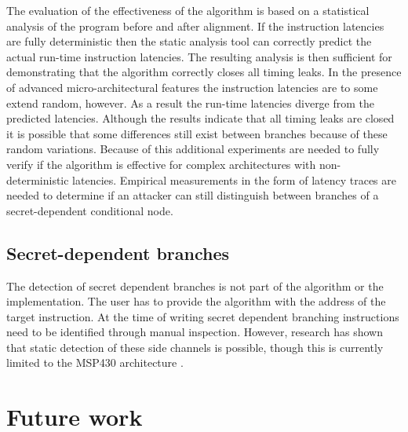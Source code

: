 The evaluation of the effectiveness of the algorithm is based on a statistical analysis of the program before and after alignment. 
If the instruction latencies are fully deterministic then the static analysis tool can correctly predict the actual run-time instruction latencies. The resulting analysis 
is then sufficient for demonstrating that the algorithm correctly closes all timing leaks. 
In the presence of advanced micro-architectural features the instruction latencies are to some extend random, however. 
As a result the run-time latencies diverge from the predicted latencies. 
Although the results indicate that all timing leaks are closed it is possible that some differences still exist between branches because of these random variations. 
Because of this additional experiments are needed to fully verify if the algorithm is effective for complex architectures with non-deterministic latencies.
Empirical measurements in the form of latency traces are needed to determine if an attacker can still distinguish between branches of a secret-dependent conditional node. 



\subsection{Secret-dependent branches}
The detection of secret dependent branches is not part of the algorithm or the implementation. The user has to provide the algorithm with the address of the target instruction. 
At the time of writing secret dependent branching instructions need to be identified through manual inspection. However, research has shown that static detection of these side channels is possible, though 
this is currently limited to the MSP430 architecture \cite{MSP430Detection}.

\section{Future work}
